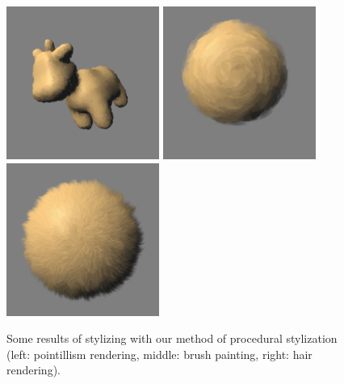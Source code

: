 \begin{figure}[H]
    \begin{center}
    \includegraphics[width=50mm, height=50mm]{Resultats/spotPoint/final.png}
    \includegraphics[width=50mm, height=50mm]{Resultats/painting1/final.png}
    \includegraphics[width=50mm, height=50mm]{Resultats/bouledepoil1/final.png}
    \end{center}
    \caption{Some results of stylizing with our method of procedural stylization (left: pointillism rendering, middle: brush painting, right: hair rendering).}
    \label{some_results}
\end{figure}
